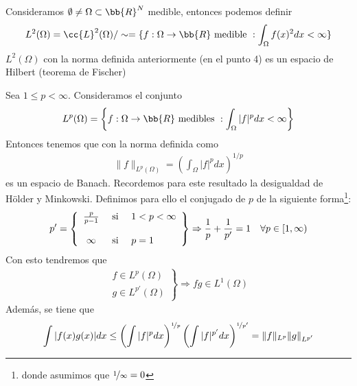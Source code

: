 \begin{ejemplo}
    Consideramos $\emptyset \neq \Omega \subset \bb{R}^N$ medible, entonces podemos definir
    \begin{gather*}
        L^2(\Omega) = \cc{L}^2(\Omega)/\sim = \{f:\Omega \to \bb{R} \text{ medible } : \int_\Omega f(x)^2 dx < \infty\}
    \end{gather*}
    $L^2(\Omega)$ con la norma definida anteriormente (en el punto 4) es un espacio de Hilbert (teorema de Fischer)
\end{ejemplo}

\begin{ejemplo}
    Sea $1 \leq p < \infty$. Consideramos el conjunto
    \begin{gather*}
        L^p(\Omega) = \left\{f: \Omega \to \bb{R} \text{ medibles } : \int_\Omega |f|^p dx < \infty\right\}
    \end{gather*}
    Entonces tenemos que con la norma definida como 
    \begin{gather*}
        \|f\|_{L^p(\Omega)} = \left(\int_\Omega |f|^p dx \right)^{1/p}
    \end{gather*}
    es un espacio de Banach. Recordemos para este resultado la desigualdad de Hölder y Minkowski. Definimos para ello el conjugado de $p$ de la siguiente forma\footnote{donde asumimos que $\nicefrac{1}{\infty} = 0$}:
    \begin{gather*}
        p' = \left\{
        \begin{array}{c c l}
            \frac{p}{p-1} & \text{ si } & 1<p<\infty\\\\
            \infty & \text{ si } & p=1
        \end{array}
        \right\} \Rightarrow \frac{1}{p} + \frac{1}{p'} = 1 \ \ \ \forall p \in [1, \infty)
    \end{gather*}
    Con esto tendremos que 
    \begin{gather*}
        \left.
            \begin{array}{c}
                f\in L^p(\Omega)\\
                g \in L^{p'}(\Omega)
            \end{array}
        \right\} \Rightarrow fg \in L^1(\Omega)
    \end{gather*}
    Además, se tiene que 
    \begin{gather*}
        \int |f(x)g(x)| dx \leq \left(\int |f|^p dx\right)^{\nicefrac{1}{p}} \left(\int |f|^{p'} dx\right)^{\nicefrac{1}{p'}} = \|f\|_{L^p} \|g\|_{L^{p'}}
    \end{gather*}
\end{ejemplo}

